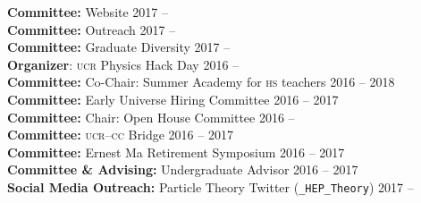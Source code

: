 \documentclass[margin,line]{resume}
\newcommand{\scap}[1]{\textsc{\MakeLowercase{#1}}}
\begin{document}
\begin{resume}
\textbf{Committee:}  Website
\hfill 2017 -- \phantom{2017}\vspace{.3mm}\\
%
\textbf{Committee:}  Outreach
\hfill 2017 -- \phantom{2017}\vspace{.3mm}\\
%
\textbf{Committee:}  Graduate Diversity
\hfill 2017 -- \phantom{2017}\vspace{.3mm}\\
%
\textbf{Organizer}: \scap{UCR} Physics Hack Day
 \hfill {2016 -- \phantom{2017}}\\
%
\textbf{Committee:}  Co-Chair: Summer Academy for \scap{HS} teachers
\hfill 2016 -- {2018}\vspace{.3mm}\\
%
\textbf{Committee:}  Early Universe Hiring Committee
\hfill 2016 -- 2017\vspace{.3mm}\\
%
\textbf{Committee:}  Chair: Open House Committee
\hfill 2016 -- \phantom{2017}\vspace{.3mm}\\
%
\textbf{Committee:}  \scap{UCR}--\scap{CC} Bridge
\hfill 2016 -- 2017\vspace{.3mm}\\
%
\textbf{Committee:}  Ernest Ma Retirement Symposium
\hfill 2016 -- 2017\vspace{.3mm}\\
%
\textbf{Committee \& Advising:} Undergraduate Advisor
\hfill 2016 -- {2017}\vspace{.3mm}\\
%
\textbf{Social Media Outreach:}  Particle Theory Twitter (\texttt{\@UCR\_HEP\_Theory})
\hfill 2017 -- \phantom{2017}%








\end{resume}
\end{document}
